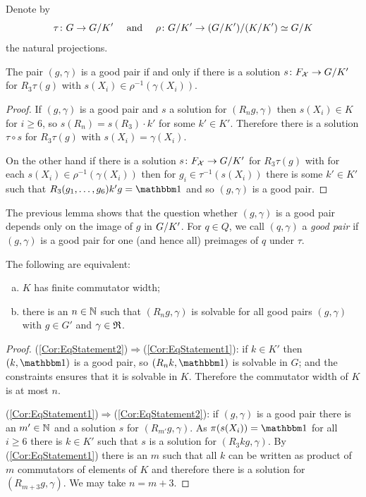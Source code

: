 \documentclass[a4paper,11pt]{amsart}
\begin{document}
\begin{lem}
 Denote by 
 \[\tau\colon G\to{G/K'}\quad\text{ and }\quad\rho\colon {G/K'} \to {({G/K'})/({K/K'})}\simeq {G/K}\]
 the natural projections.
 
 The pair $(g,\gamma)$ is a good pair if and only if there is a solution $s\colon F_{\mathcal{X}} \to {G/K'}$
 for $R_3\tau(g)$ with $s(X_i) \in \rho^{-1}(\gamma(X_i))$. 
\end{lem}
\begin{proof}
 If $(g,\gamma)$ is a good pair and $s$ a solution for $(R_ng,\gamma)$ 
 then $s(X_i)\in K$ for $i\geq6$, so $s(R_n) = s(R_3) \cdot k'$ for some $k'\in K'$. 
 Therefore there is a solution $\tau\circ s$ for $R_3\tau(g)$ with $s(X_i) = \gamma(X_i)$.
 
 On the other hand if there is a solution $s\colon F_{\mathcal{X}} \to {G/K'}$ 
 for $R_3\tau(g)$ with for each $s(X_i) \in \rho^{-1}(\gamma(X_i))$ then
 for $g_i \in \tau^{-1}(s(X_i))$ there is some $k'\in K'$ such that
 $R_3(g_1,\dotsc,g_6)k'g=\id$ and so $(g,\gamma)$ is a good pair.
\end{proof}
The previous lemma shows that the question whether $(g,\gamma)$ is a
good pair depends only on the image of $g$ in ${G/K'}$. For
$q\in Q$, we call $(q,\gamma)$ a \emph{good pair} if $(g,\gamma)$ is a
good pair for one (and hence all) preimages of $q$ under $\tau$.
\begin{cor}\label{cor:finiteCommutatorWidthKimpliesBoundedConstraintedCommutators}
The following are equivalent:
\begin{enumerate}[(a)]
 \item $K$ has finite commutator width; \label{Cor:EqStatement1}
 \item there is an $n\in\mathbb{N}$ such that $(R_n g,\gamma)$ is solvable 
 for all good pairs $(g,\gamma)$ with $g \in G'$ and $\gamma\in\mathfrak{R}$.
 \label{Cor:EqStatement2}
\end{enumerate} 
\end{cor}
\begin{proof}
 (\ref{Cor:EqStatement2})$\Rightarrow$(\ref{Cor:EqStatement1}): if $k\in K'$ then $(k,\id)$ is a good pair, so $(R_nk,\id)$ is solvable in $G$; and the constraints ensures that it is solvable in $K$.
 Therefore the commutator width of $K$ is at most $n$.
 
 (\ref{Cor:EqStatement1})$\Rightarrow$(\ref{Cor:EqStatement2}): if
 $(g,\gamma)$ is a good pair there is an $m'\in \mathbb{N}$ and a solution
 $s$ for $(R_{m'} g,\gamma)$. As $\pi(s(X_i)) =\id$ for all $i\geq 6$
 there is $k\in K'$ such that $s$ is a solution for
 $(R_3kg,\gamma)$. By (\ref{Cor:EqStatement1}) there is an $m$ such
 that all $k$ can be written as product of $m$ commutators of elements
 of $K$ and therefore there is a solution for $(R_{m+3}g,\gamma)$. We
 may take $n=m+3$.
\end{proof}
\end{document}
